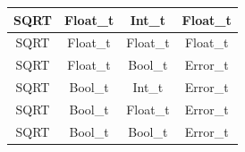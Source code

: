 \begin{figure}[H]
\begin{tabular}{cccc}
        \midrule SQRT & Float\_t & Int\_t    & Float\_t \\
        \midrule SQRT & Float\_t & Float\_t  & Float\_t \\
        \midrule SQRT & Float\_t & Bool\_t   & Error\_t \\

        \midrule SQRT & Bool\_t & Int\_t     & Error\_t \\
        \midrule SQRT & Bool\_t & Float\_t   & Error\_t \\
        \midrule SQRT & Bool\_t & Bool\_t    & Error\_t \\

        \bottomrule
    \end{tabular}\\
\end{figure}

\newpage


